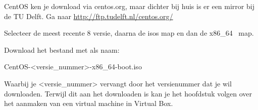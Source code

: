 CentOS ken je download via centos.org, maar dichter bij huis is er een mirror bij de TU Delft. Ga naar
\url{http://ftp.tudelft.nl/centos.org/}

{
Selecteer de meest recente 8 versie, daarna de isos map en dan de x86\_64 \ map.}

{
Download het bestand met als naam:}

{
CentOS-{\textless}versie\_nummer{\textgreater}-x86\_64-boot.iso}

{
Waarbij je {\textless}versie\_nummer{\textgreater} vervangt door het versienummer dat je wil downloaden. Terwijl dit aan
het downloaden is kan je het hoofdstuk volgen over het aanmaken van een virtual machine in Virtual Box.}

